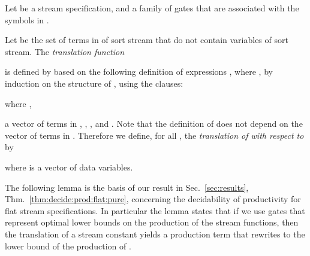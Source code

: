 \begin{definition}\label{def:trnsl:nets}\normalfont
Let  be a stream specification,
  and  a family of gates that
  are associated with the symbols in .
  
  Let  be the set of terms in 
  of sort stream that do not contain variables of sort stream. 
The \emph{translation function}
  
  is defined by 
  based on the following definition of expressions
  , where ,
  by induction 
  on the structure of ,
  using the clauses:

where , 
  
  a vector of terms in , 
  ,\linebreak
  ,
  and 
  .
Note that the definition
  of 
  does not depend on the vector  of terms
  in .
  Therefore we define, for all ,
  the \emph{translation of  with respect to } by 
  
  where 
  is a vector of data variables. 
\end{definition}





The following lemma is the basis of our result in Sec.~\ref{sec:results},
Thm.~\ref{thm:decide:prod:flat:pure}, concerning the decidability of 
\daob{} productivity for flat stream specifications.
In particular the lemma states that if we use gates that represent \daobly{} optimal lower bounds
on the production of the stream functions,
then the translation of a stream constant 
yields a production term that rewrites to the \daob{} lower bound of the production of .




